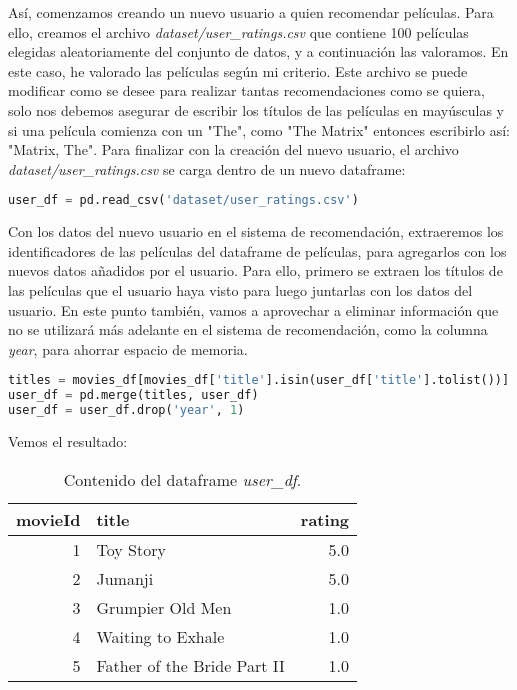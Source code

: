 \documentclass{uimppracticas}
\begin{document}
Así, comenzamos creando un nuevo usuario a quien recomendar películas. Para ello, creamos el archivo \textit{dataset/user\_ratings.csv} que contiene 100 películas elegidas aleatoriamente del conjunto de datos, y a continuación las valoramos. En este caso, he valorado las películas según mi criterio. Este archivo se puede modificar como se desee para realizar tantas recomendaciones como se quiera, solo nos debemos asegurar de escribir los títulos de las películas en mayúsculas y si una película comienza con un "The", como "The Matrix" entonces escribirlo así: "Matrix, The". Para finalizar con la creación del nuevo usuario, el archivo \textit{dataset/user\_ratings.csv} se carga dentro de un nuevo dataframe:

\begin{lstlisting}[language=python]
user_df = pd.read_csv('dataset/user_ratings.csv')
\end{lstlisting}

Con los datos del nuevo usuario en el sistema de recomendación, extraeremos los identificadores de las películas del dataframe de películas, para agregarlos con los nuevos datos añadidos por el usuario. Para ello, primero se extraen los títulos de las películas que el usuario haya visto para luego juntarlas con los datos del usuario. En este punto también, vamos a aprovechar a eliminar información que no se utilizará más adelante en el sistema de recomendación, como la columna \textit{year}, para ahorrar espacio de memoria.

\begin{lstlisting}[language=python]
titles = movies_df[movies_df['title'].isin(user_df['title'].tolist())]
user_df = pd.merge(titles, user_df)
user_df = user_df.drop('year', 1)
\end{lstlisting}

\newpage

Vemos el resultado:

\begin{table}[h]
	\centering
	\begin{tabular}{rlr}
		\toprule
		movieId &                        title &  rating \\
		\midrule
		1 &                    Toy Story &     5.0 \\
		2 &                      Jumanji &     5.0 \\
		3 &             Grumpier Old Men &     1.0 \\
		4 &            Waiting to Exhale &     1.0 \\
		5 &  Father of the Bride Part II &     1.0 \\
		\bottomrule
	\end{tabular}
	\caption{Contenido del dataframe \textit{user\_df}.}
	\label{user_df}
\end{table}
\end{document}

